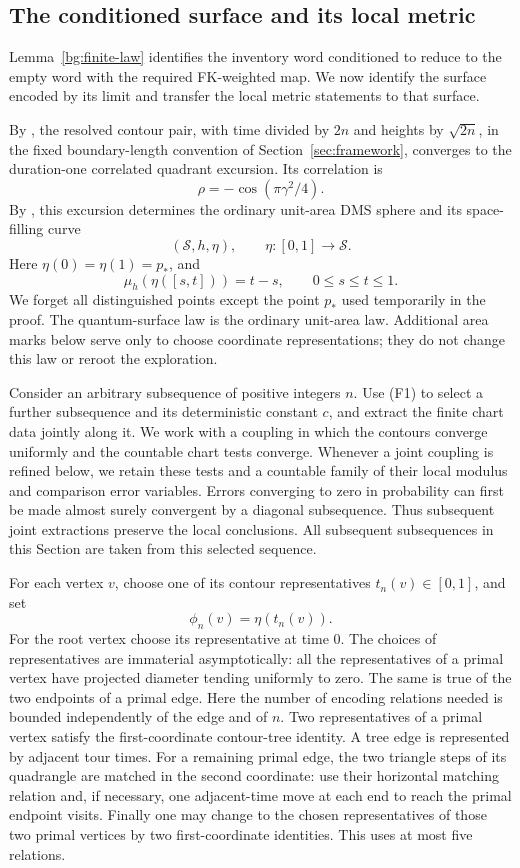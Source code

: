 \subsection{The conditioned surface and its local metric}

Lemma~\ref{bg:finite-law} identifies the inventory word conditioned
to reduce to the empty word with the required FK-weighted map. We now
identify the surface encoded by its limit and transfer the local metric
statements to that surface.

By \cite[Theorem 1.8]{GwynneSunFinite}, the resolved contour pair, with
time divided by \(2n\) and heights by \(\sqrt{2n}\), in the fixed
boundary-length convention of Section~\ref{sec:framework}, converges to the duration-one correlated
quadrant excursion.  Its correlation is
\[
 \rho=-\cos(\pi\gamma^2/4).
\]
By \cite[Theorem 1.1]{MillerSheffieldSphere}, this excursion determines
the ordinary unit-area DMS sphere and its space-filling curve
\[
                 (\mathcal S,h,\eta),\qquad \eta:[0,1]\to\mathcal S.
\]
Here \(\eta(0)=\eta(1)=p_*\), and
\[
           \mu_h(\eta([s,t]))=t-s,\qquad 0\le s\le t\le1.
\]
We forget all distinguished points except the point \(p_*\) used
temporarily in the proof.  The quantum-surface law is the ordinary unit-area law.
Additional area marks below serve only to choose coordinate
representations; they do not change this law or reroot the exploration.

Consider an arbitrary subsequence of positive integers \(n\).
Use (F1) to select a further subsequence and its deterministic
constant \(c\), and extract the finite chart data jointly along it.
We work with a coupling in which the contours converge uniformly and
the countable chart tests converge.  Whenever a joint coupling is
refined below, we retain these tests and a countable family of their
local modulus and comparison error variables.  Errors converging to
zero in probability can first be made almost surely convergent by a
diagonal subsequence.  Thus subsequent joint extractions preserve the
local conclusions.  All subsequent subsequences in this Section are
taken from this selected sequence.

For each vertex \(v\), choose one of its contour representatives
\(t_n(v)\in[0,1]\), and set
\[
                    \phi_n(v)=\eta(t_n(v)).
\]
For the root vertex choose its representative at time \(0\).
The choices of representatives are immaterial asymptotically:
all the representatives of a primal vertex have projected diameter
tending uniformly to zero.  The same is true of the two endpoints of
a primal edge.  Here the number of encoding relations needed is
bounded independently of the edge and of \(n\).
Two representatives of a primal vertex satisfy the first-coordinate
contour-tree identity.  A tree edge is represented by adjacent tour
times.  For a remaining primal edge, the two triangle steps of its
quadrangle are matched in the second coordinate: use their horizontal
matching relation and, if necessary, one adjacent-time move at each
end to reach the primal endpoint visits.  Finally one may change to
the chosen representatives of those two primal vertices by two
first-coordinate identities.  This uses at most five relations.

